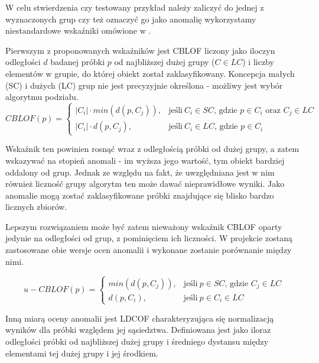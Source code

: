 \documentclass[11pt,a4paper,twoside]{article}
\begin{document}
W celu stwierdzenia czy testowany przykład należy zaliczyć do jednej z wyznaczonych grup czy też oznaczyć go jako anomalię wykorzystamy niestandardowe wskaźniki omówione w \cite{miaryNietypowosci}.


Pierwszym z proponowanych wskaźników jest CBLOF liczony jako iloczyn odległości $d$ badanej próbki $p$ od najbliższej dużej grupy ($C \in LC$) i liczby elementów w grupie, do której obiekt został zaklasyfikowany. Koncepcja małych (SC) i dużych (LC) grup nie jest precyzyjnie określona - możliwy jest wybór algorytmu podziału.
\begin{equation}
CBLOF(p) = \begin{cases}
   |C_{i}| \cdot min(d(p,C_{j})), & \text{jeśli}\ C_{i} \in SC \text{, gdzie } p \in C_{i} \text{ oraz } C_{j} \in LC\\
    |C_{i}| \cdot d(p,C_{j}), & \text{jeśli}\ C_{i} \in LC \text{, gdzie } p \in C_{i}
  \end{cases}
\end{equation}

Wskaźnik ten powinien rosnąć wraz z odległością próbki od dużej grupy, a zatem wskazywać na stopień anomali - im wyższa jego wartość, tym obiekt bardziej oddalony od grup. Jednak ze względu na fakt, że uwzględniana jest w nim również liczność grupy algorytm ten może dawać nieprawidłowe wyniki. Jako anomalie mogą zostać zaklasyfikowane próbki znajdujące się blisko bardzo licznych zbiorów.

Lepszym rozwiązaniem może być zatem nieważony wskaźnik CBLOF oparty jedynie na odległości od grup, z pominięciem ich liczności. W projekcie zostaną zastosowane obie wersje ocen anomalii i wykonane zostanie porównanie między nimi.

\begin{equation}
u-CBLOF(p) = \begin{cases}
   min(d(p,C_{j})), & \text{jeśli}\ p \in SC \text{, gdzie } C_{j} \in LC\\
    d(p,C_{i}), & \text{jeśli}\ p \in C_{i} \in LC
  \end{cases}
\end{equation}

Inną miarą oceny anomalii jest LDCOF charakteryzująca się normalizacją wyników dla próbki względem jej sąsiedztwa. Definiowana jest jako iloraz odległości próbki od najbliższej dużej grupy i średniego dystansu między elementami tej dużej grupy i jej środkiem.
\end{document}
